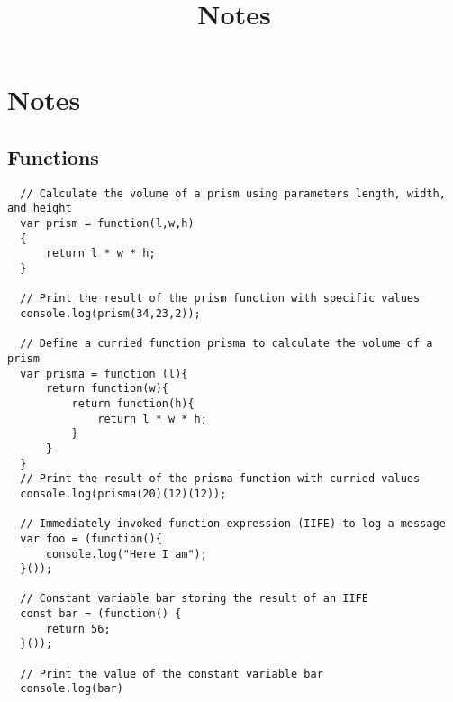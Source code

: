 \documentclass[12pt,a4paper, twosite]{article}
\date{}
\title{Notes}
\begin{document}
\maketitle
\tableofcontents

\newpage

\section{Notes}
\subsection{Functions}

\begin{verbatim}
  // Calculate the volume of a prism using parameters length, width, and height
  var prism = function(l,w,h)
  {
      return l * w * h;
  }

  // Print the result of the prism function with specific values
  console.log(prism(34,23,2));

  // Define a curried function prisma to calculate the volume of a prism
  var prisma = function (l){
      return function(w){
          return function(h){
              return l * w * h;
          }
      }
  }
  // Print the result of the prisma function with curried values
  console.log(prisma(20)(12)(12));

  // Immediately-invoked function expression (IIFE) to log a message
  var foo = (function(){
      console.log("Here I am");
  }());

  // Constant variable bar storing the result of an IIFE
  const bar = (function() {
      return 56;
  }());

  // Print the value of the constant variable bar
  console.log(bar)
\end{verbatim}

\newpage
\end{document}
